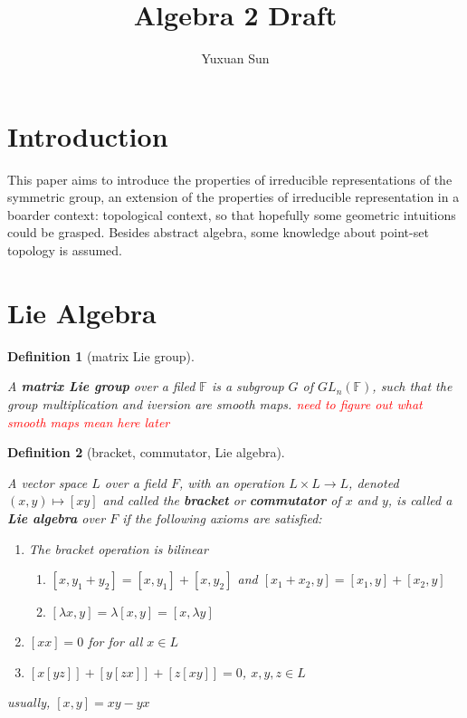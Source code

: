 \documentclass[a4paper]{article}
\title{Algebra 2 Draft}
\author{Yuxuan Sun}
\newcommand{\F}{\mathbb{F}}
\newtheorem{definition}{Definition}[section]
\begin{document}
\maketitle

\section{Introduction}
This paper aims to introduce the properties of irreducible representations of the symmetric group, an extension of the properties of irreducible representation in a boarder context: topological context, so that hopefully some geometric intuitions could be grasped. Besides abstract algebra, some knowledge about point-set topology is assumed.

\section{Lie Algebra}
\begin{definition}[matrix Lie group]
\citep{seitz-mcleese_classifying_nodate}

	A \textbf{matrix Lie group} over a filed $\mathbb{F}$ is a subgroup  $G$ of  $GL_n(\F)$, such that the group multiplication and iversion are smooth maps. \textcolor{red}{need to figure out what smooth maps mean here later} 
\end{definition}

\bigskip

\begin{definition}[bracket, commutator, Lie algebra]
\citep{Humph}

	A vector space $L$ over a field $F$, with an operation $L \times L \to  L$, denoted $(x,y) \mapsto [xy]$ and called the  \textbf{bracket} or \textbf{commutator} of $x$ and  $y$, is called a  \textbf{Lie algebra} over $F$ if the following axioms are satisfied:

	 \begin{enumerate}
		 \item The bracket operation is bilinear
\begin{enumerate}
	\item $[x,y_1+y_2] = [x,y_1] + [x,y_2]$ and $[x_1+x_2,y] = [x_1,y] + [x_2,y]$
	\item $[\lambda x, y] = \lambda[x,y] = [x, \lambda y]$
\end{enumerate}
		 \item $[x x] = 0$ for for all  $x \in L$
		 \item $[x[yz]]+[y[zx]] +[z[xy]] = 0$,  $x,y,z \in L$
	\end{enumerate}
	usually, $[x,y] = xy - yx$	
\end{definition}
\end{document}
